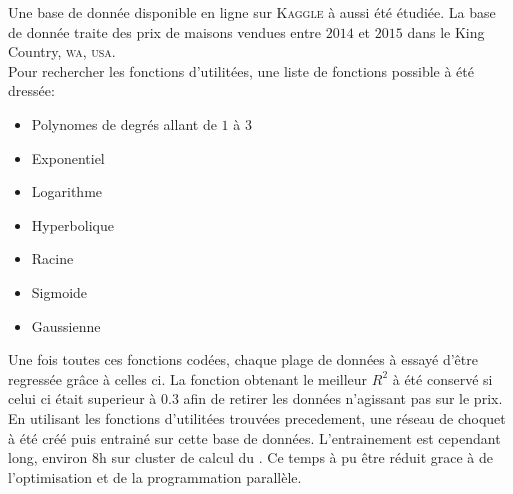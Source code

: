 Une base de donnée disponible en ligne sur \textsc{Kaggle} à aussi été étudiée\cite{kaggle}.
La base de donnée traite des prix de maisons vendues entre $2014$ et $2015$
dans le King Country, \textsc{wa}, \textsc{usa}.\\


Pour rechercher les fonctions d'utilitées, une liste de fonctions possible à été dressée:
\begin{itemize}
    \item Polynomes de degrés allant de $1$ à $3$
    \item Exponentiel
    \item Logarithme
    \item Hyperbolique
    \item Racine
    \item Sigmoide
    \item Gaussienne
\end{itemize}
Une fois toutes ces fonctions codées, chaque plage de données à essayé d'être regressée grâce à celles ci.
La fonction obtenant le meilleur $R^2$ à été conservé si celui ci était superieur à $0.3$ afin de retirer
les données n'agissant pas sur le prix.\\


En utilisant les fonctions d'utilitées trouvées precedement, une réseau de choquet à été créé puis entrainé
sur cette base de données.
L'entrainement est cependant long, environ $8$h sur cluster de calcul du \lri.
Ce temps à pu être réduit grace à de l'optimisation et de la programmation parallèle.
